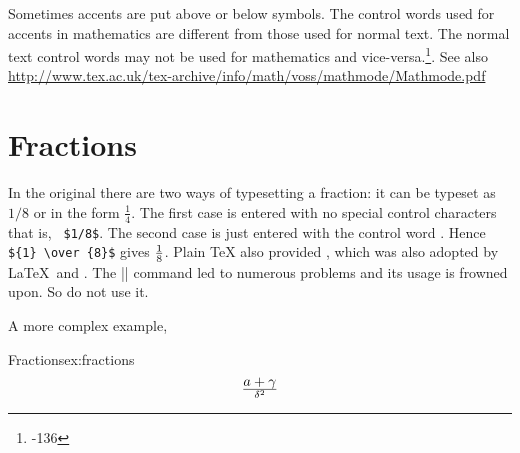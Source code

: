 %


Sometimes accents are put above or below symbols. The control words used for accents
in mathematics are different from those used for normal text. The normal text control words
may not be used for mathematics and vice-versa.\footnote{-136 }. See also
\href{mathmode.pdf}{http://www.tex.ac.uk/tex-archive/info/math/voss/mathmode/Mathmode.pdf}

\section{Fractions}

In the original \tex there are two ways of typesetting a fraction: it can be typeset as $1/8$ or in the form $\frac{1}{4}$. The first case is entered with no special control characters that is,  \verb+ $1/8$+. The second case is just entered with the control word \cmd{\over}.  Hence\verb+ ${1} \over {8}$+ gives ${1} \over {8}$. 
Plain TeX also provided , which was also adopted by \LaTeX\  and .
The |\over| command led to numerous problems and its usage is frowned upon. So do not use it.

A more complex example,

\begin{texexample}{Fractions}{ex:fractions}
\[
a+\gamma \over \delta^2
\]

\end{texexample}



